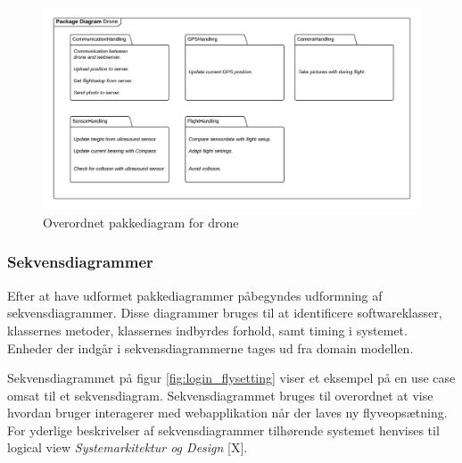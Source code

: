 \begin{figure}[H]
	\centering
	\includegraphics[width=1\textwidth]{Billeder/Projektbeskrivelse/Packagediagram_drone}
	\vspace{-0.9cm}	
	\caption{Overordnet pakkediagram for drone}
	\label{fig:package_drone}
\end{figure}

\newpage

\subsubsection*{Sekvensdiagrammer}
\vspace{-0.3cm}	

Efter at have udformet pakkediagrammer påbegyndes udformning af sekvensdiagrammer. Disse diagrammer bruges til at identificere softwareklasser, klassernes metoder, klassernes indbyrdes forhold, samt timing i systemet. Enheder der indgår i sekvensdiagrammerne tages ud fra domain modellen. 

Sekvensdiagrammet på figur \ref{fig:login_flysetting} viser et eksempel på en use case omsat til et sekvensdiagram. Sekvensdiagrammet bruges til overordnet at vise hvordan bruger interagerer med webapplikation når der laves ny flyveopsætning. For yderlige beskrivelser af sekvensdiagrammer tilhørende systemet henvises til logical view \textit{Systemarkitektur og Design} [X].
 
